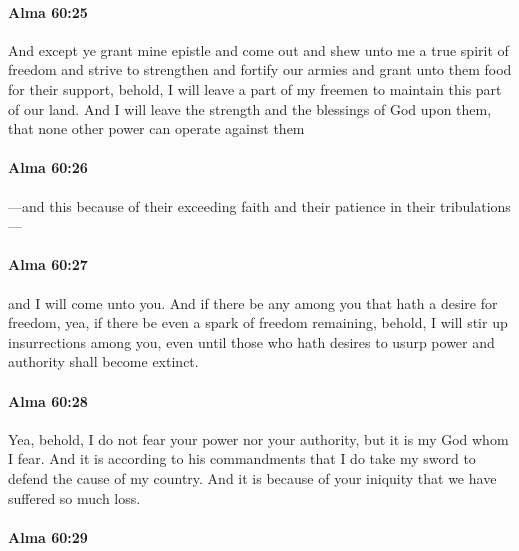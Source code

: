 		\paragraph{Alma 60:25} %
			\label{ALMA-60-25}

			And except ye grant mine epistle
			and come out and shew unto me a true spirit of freedom
			and strive to strengthen and fortify our armies
			and grant unto them food for their support,
			behold, I will leave a part of my freemen to maintain this part of our land.
			And I will leave the strength and the blessings of God upon them,
			that none other power can operate against them

		\paragraph{Alma 60:26} %
			\label{ALMA-60-26}

			---and this because of their exceeding faith and their patience in their tribulations---

		\paragraph{Alma 60:27} %
			\label{ALMA-60-27}

			and I will come unto you.
			And if there be any among you that hath a desire for freedom,
			yea, if there be even a spark of freedom remaining,
			behold, I will stir up insurrections among you,
			even until those who hath desires to usurp power and authority
			shall become extinct.

		\paragraph{Alma 60:28} %
			\label{ALMA-60-28}

			Yea, behold, I do not fear your power nor your authority,
			but it is my God whom I fear.
			And it is according to his commandments
			that I do take my sword to defend the cause of my country.
			And it is because of your iniquity that we have suffered so much loss.

		\paragraph{Alma 60:29} %
			\label{ALMA-60-29}

